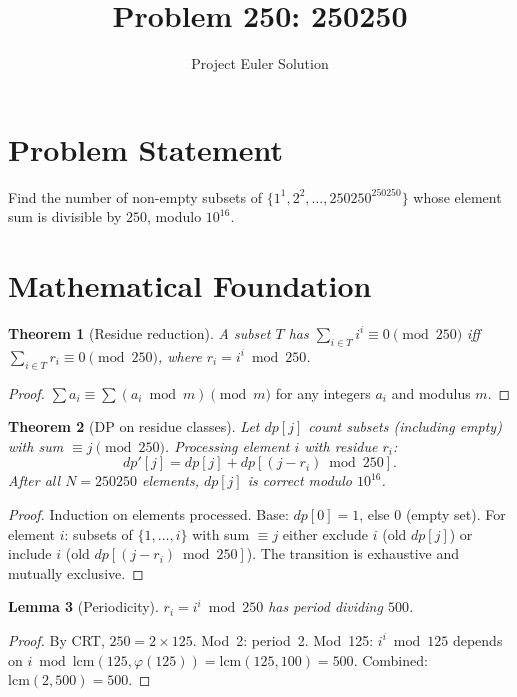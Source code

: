 \documentclass[12pt]{article}
\title{Problem 250: 250250}
\author{Project Euler Solution}
\date{}
\newtheorem{theorem}{Theorem}
\newtheorem{lemma}[theorem]{Lemma}
\begin{document}
\maketitle

\section{Problem Statement}

Find the number of non-empty subsets of $\{1^1,2^2,\ldots,250250^{250250}\}$ whose element sum is divisible by $250$, modulo $10^{16}$.

\section{Mathematical Foundation}

\begin{theorem}[Residue reduction]\label{thm:res}
A subset $T$ has $\sum_{i\in T}i^i\equiv 0\pmod{250}$ iff $\sum_{i\in T}r_i\equiv 0\pmod{250}$, where $r_i=i^i\bmod 250$.
\end{theorem}

\begin{proof}
$\sum a_i\equiv\sum(a_i\bmod m)\pmod{m}$ for any integers $a_i$ and modulus $m$.
\end{proof}

\begin{theorem}[DP on residue classes]\label{thm:dp}
Let $dp[j]$ count subsets (including empty) with sum $\equiv j\pmod{250}$. Processing element $i$ with residue $r_i$:
\[
dp'[j]=dp[j]+dp[(j-r_i)\bmod 250].
\]
After all $N=250250$ elements, $dp[j]$ is correct modulo $10^{16}$.
\end{theorem}

\begin{proof}
Induction on elements processed. Base: $dp[0]=1$, else $0$ (empty set). For element $i$: subsets of $\{1,\ldots,i\}$ with sum $\equiv j$ either exclude $i$ (old $dp[j]$) or include $i$ (old $dp[(j-r_i)\bmod 250]$). The transition is exhaustive and mutually exclusive.
\end{proof}

\begin{lemma}[Periodicity]\label{lem:period}
$r_i=i^i\bmod 250$ has period dividing $500$.
\end{lemma}

\begin{proof}
By CRT, $250=2\times 125$. Mod~2: period~2. Mod~125: $i^i\bmod 125$ depends on $i\bmod\mathrm{lcm}(125,\varphi(125))=\mathrm{lcm}(125,100)=500$. Combined: $\mathrm{lcm}(2,500)=500$.
\end{proof}
\end{document}

